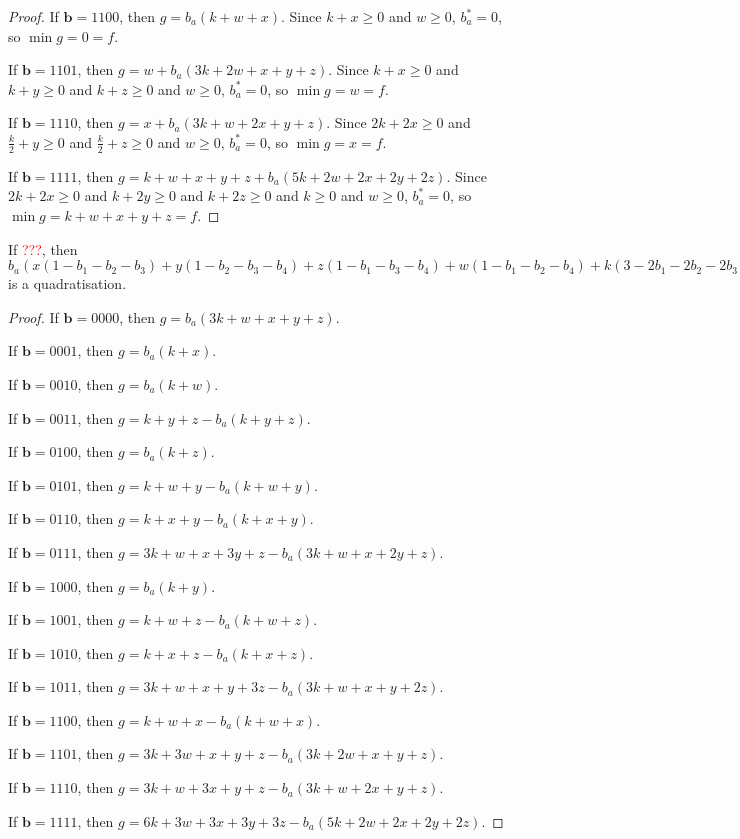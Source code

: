 \documentclass[11pt]{scrartcl}
\newcommand{\vc}[1]{\boldsymbol{#1}}
\begin{document}
\begin{proof}
If $\vc b = 1100$, then $g = b_a(k + w + x)$.
Since $k + x \ge 0$ and $w \ge 0$, $b_a^* = 0$, so $\min g = 0 = f$.

If $\vc b = 1101$, then $g = w + b_a(3k + 2w + x + y + z)$.
Since $k + x\ge 0 $ and $k + y \ge 0$ and $k + z \ge 0$ and $w \ge 0$, $b_a^* = 0$, so $\min g = w = f$.

If $\vc b = 1110$, then $g = x + b_a(3k + w + 2x + y + z)$.
Since $2k + 2x \ge 0$ and $\frac{k}{2} + y \ge 0$ and $\frac{k}{2} + z \ge 0$ and $w \ge 0$, $b_a^* = 0$, so $\min g = x = f$.

If $\vc b = 1111$, then $g = k + w + x + y + z + b_a(5k + 2w + 2x + 2y + 2z)$.
Since $2k + 2x \ge 0$ and $ k + 2y \ge 0$ and $k + 2z \ge 0$ and $k \ge 0$ and $w \ge 0$, $b_a^* = 0$, so $\min g = k + w + x + y + z = f$.

\end{proof}

\begin{lemma}
 If \textcolor{red}{???}, then $b_a(x(1-b_1-b_2-b_3)+y(1-b_2-b_3-b_4)+z(1-b_1-b_3-b_4)+w(1-b_1-b_2-b_4)+k(3-2b_1-2b_2-2b_3-2b_4))+x(+b_1b_2+b_1b_3+b_2b_3)+y(+b_2b_3+b_2b_4+b_3b_4)+z(+b_1b_3+b_1b_4+b_3b_4)+w(+b_1b_2+b_1b_4+b_2b_4)+k(+b_1b_2+b_1b_3+b_1b_4+b_2b_3+b_2b_4+b_3b_4)$ is a quadratisation.\\
 \end{lemma}

\begin{proof}
If $\vc b = 0000$, then $g = b_a(3k + w + x + y + z)$.

If $\vc b = 0001$, then $g = b_a(k + x)$.

If $\vc b = 0010$, then $g = b_a(k + w)$.

If $\vc b = 0011$, then $g = k + y + z - b_a(k + y + z)$.

If $\vc b = 0100$, then $g = b_a(k + z)$.

If $\vc b = 0101$, then $g = k + w + y - b_a(k + w + y)$.

If $\vc b = 0110$, then $g = k + x + y - b_a(k + x + y)$.

If $\vc b = 0111$, then $g = 3k + w + x + 3y + z - b_a(3k + w + x + 2y + z)$.

If $\vc b = 1000$, then $g = b_a(k + y)$.

If $\vc b = 1001$, then $g = k + w + z - b_a(k + w + z)$.

If $\vc b = 1010$, then $g = k + x + z - b_a(k + x + z)$.

If $\vc b = 1011$, then $g = 3k + w + x + y + 3z - b_a(3k + w + x + y + 2z)$.

If $\vc b = 1100$, then $g = k + w + x - b_a(k + w + x)$.

If $\vc b = 1101$, then $g = 3k + 3w + x + y + z - b_a(3k + 2w + x + y + z)$.

If $\vc b = 1110$, then $g = 3k + w + 3x + y + z - b_a(3k + w + 2x + y + z)$.

If $\vc b = 1111$, then $g = 6k + 3w + 3x + 3y + 3z - b_a(5k + 2w + 2x + 2y + 2z)$.

\end{proof}
\end{document}

